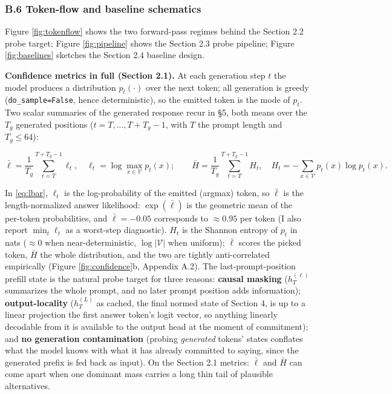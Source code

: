 \subsubsection{B.6 Token-flow and baseline
schematics}\label{b.6-token-flow-and-baseline-schematics}

Figure \ref{fig:tokenflow} shows the two forward-pass regimes behind the
Section 2.2 probe target; Figure \ref{fig:pipeline} shows the Section
2.3 probe pipeline; Figure \ref{fig:baselines} sketches the Section 2.4
baseline design.

\textbf{Confidence metrics in full (Section 2.1).}
At each generation step \(t\) the model produces a distribution
\(p_t(\cdot)\) over the next token; all generation is greedy
(\texttt{do\_sample=False}, hence deterministic), so the emitted token
is the mode of \(p_t\). Two scalar summaries of the generated response
recur in §5, both means over the \(T_g\) generated positions
(\(t = T, \ldots, T+T_g-1\), with \(T\) the prompt length and
\(T_g \le 64\)):

\begin{equation}
\bar\ell = \frac{1}{T_g} \sum_{t=T}^{T+T_g-1} \ell_t,
\quad \ell_t = \log \max_{x \in \mathcal{V}} p_t(x);
\qquad
\bar H = \frac{1}{T_g} \sum_{t=T}^{T+T_g-1} H_t,
\quad H_t = -\sum_{x \in \mathcal{V}} p_t(x) \log p_t(x).
\label{eq:lbar}
\end{equation}

In \eqref{eq:lbar}, \(\ell_t\) is the log-probability of the emitted
(argmax) token, so \(\bar\ell\) is the length-normalized answer
likelihood: \(\exp(\bar\ell)\) is the geometric mean of the per-token
probabilities, and \(\bar\ell = -0.05\) corresponds to \(\approx 0.95\)
per token (I also report \(\min_t \ell_t\) as a worst-step diagnostic).
\(H_t\) is the Shannon entropy of \(p_t\) in nats
(\(\approx 0\) when near-deterministic, \(\log|\mathcal{V}|\) when
uniform); \(\bar\ell\) scores the picked token, \(\bar H\) the whole
distribution, and the two are tightly anti-correlated empirically
(Figure \ref{fig:confidence}b, Appendix A.2).
 The last-prompt-position prefill state is the natural
probe target for three reasons: \textbf{causal masking}
(\(h^{(\ell)}_T\) summarizes the whole prompt, and no later prompt
position adds information); \textbf{output-locality} (\(h^{(L)}_T\) as
cached, the final normed state of Section 4, is up to a linear
projection the first answer token's logit vector, so anything linearly
decodable from it is available to the output head at the moment of
commitment); and \textbf{no generation contamination} (probing
\emph{generated} tokens' states conflates what the model knows with what
it has already committed to saying, since the generated prefix is fed
back as input). On the Section 2.1 metrics: \(\bar\ell\) and \(\bar H\)
can come apart when one dominant mass carries a long thin tail of
plausible alternatives.

